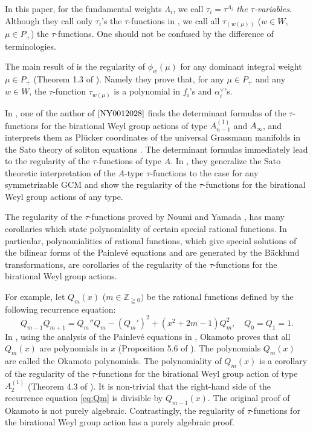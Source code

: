 \documentclass[12pt,twoside]{article}
\newcommand\av{\alpha^\vee}
\newcommand\Z{{\mathbb Z}} %
\theoremstyle{plain} %
\theoremstyle{definition} %
\theoremstyle{definition} %
\numberwithin{theorem}{section}
\numberwithin{equation}{section}
\numberwithin{figure}{section}
\numberwithin{table}{section}
\begin{document}
In this paper, for the fundamental weights $\Lambda_i$, 
we call $\tau_i=\tau^{\Lambda_i}$ {\em the $\tau$-variables}.
Although they call only $\tau_i$'s the $\tau$-functions in \cite{NY0012028},
we call all $\tau_{(w(\mu))}$ ($w\in W$, $\mu\in P_+$) the $\tau$-functions. 
One should not be confused by the difference of terminologies.

The main result of \cite{NY0012028} is the regularity of $\phi_w(\mu)$ 
for any dominant integral weight $\mu\in P_+$ (Theorem 1.3 of \cite{NY0012028}).
Namely they prove that, for any $\mu\in P_+$ and any $w\in W$, 
the $\tau$-function $\tau_{w(\mu)}$ is a polynomial in $f_i$'s and $\av_i$'s.

In \cite{Yamada9808002}, one of the author of $\cite{NY0012028}$ finds
the determinant formulas of the $\tau$-functions 
for the birational Weyl group actions of type $A^{(1)}_{n-1}$ and $A_\infty$,
and interprets them as Pl\"ucker coordinates of
the universal Grassmann manifolds in the Sato theory of soliton equations \cite{Sato-Sato}.
The determinant formulas immediately lead to 
the regularity of the $\tau$-functions of type $A$.
In \cite{NY0012028}, they generalize the Sato theoretic interpretation of 
the $A$-type $\tau$-functions to the case for any symmetrizable GCM
and show the regularity of the $\tau$-functions 
for the birational Weyl group actions of any type.

The regularity of the $\tau$-functions proved by Noumi and Yamada \cite{Yamada9808002}, \cite{NY0012028}
has many corollaries which state polynomiality of certain special rational functions. 
In particular, polynomialities of rational functions, 
which give special solutions of the bilinear forms of the Painlev\'e equations 
and are generated by the B\"acklund transformations, 
are corollaries of the regularity of the $\tau$-functions
for the birational Weyl group actions.

For example, let $Q_m(x)$ ($m\in\Z_{\geqq0})$ be the rational functions 
defined by the following recurrence equation:
\begin{equation}
 Q_{m-1} Q_{m+1} = Q_m'' Q_m - (Q_m')^2 + (x^2+2m-1)Q_m^2,
 \quad Q_0=Q_1=1.
\label{eq:Qm}
\end{equation}
In \cite{OkamotoIII}, 
using the analysis of the Painlev\'e equations in \cite{Okamoto1981},
Okamoto proves that all $Q_m(x)$ are polynomials in $x$
(Proposition 5.6 of \cite{OkamotoIII}).
The polynomials $Q_m(x)$ are called the Okamoto polynomials.
The polynomiality of $Q_m(x)$ is a corollary of the regularity of
the $\tau$-functions for the birational Weyl group action of type $A^{(1)}_2$
(Theorem 4.3 of \cite{NY9708018}).
It is non-trivial that 
the right-hand side of the recurrence equation \eqref{eq:Qm} 
is divisible by $Q_{m-1}(x)$.
The original proof of Okamoto is not purely algebraic. 
Contrastingly, 
the regularity of $\tau$-functions for the birational Weyl group action
has a purely algebraic proof.
\end{document}
